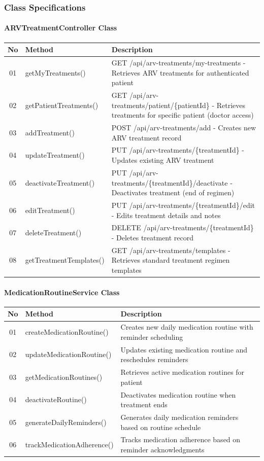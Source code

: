 \documentclass[12pt,a4paper]{article}
\begin{document}
\subsubsection{Class Specifications}

\paragraph{ARVTreatmentController Class}
\begin{longtable}{|c|l|p{8cm}|}
\hline
\textbf{No} & \textbf{Method} & \textbf{Description} \\
\hline
01 & getMyTreatments() & GET /api/arv-treatments/my-treatments - Retrieves ARV treatments for authenticated patient \\
\hline
02 & getPatientTreatments() & GET /api/arv-treatments/patient/\{patientId\} - Retrieves treatments for specific patient (doctor access) \\
\hline
03 & addTreatment() & POST /api/arv-treatments/add - Creates new ARV treatment record \\
\hline
04 & updateTreatment() & PUT /api/arv-treatments/\{treatmentId\} - Updates existing ARV treatment \\
\hline
05 & deactivateTreatment() & PUT /api/arv-treatments/\{treatmentId\}/deactivate - Deactivates treatment (end of regimen) \\
\hline
06 & editTreatment() & PUT /api/arv-treatments/\{treatmentId\}/edit - Edits treatment details and notes \\
\hline
07 & deleteTreatment() & DELETE /api/arv-treatments/\{treatmentId\} - Deletes treatment record \\
\hline
08 & getTreatmentTemplates() & GET /api/arv-treatments/templates - Retrieves standard treatment regimen templates \\
\hline
\end{longtable}

\paragraph{MedicationRoutineService Class}
\begin{longtable}{|c|l|p{8cm}|}
\hline
\textbf{No} & \textbf{Method} & \textbf{Description} \\
\hline
01 & createMedicationRoutine() & Creates new daily medication routine with reminder scheduling \\
\hline
02 & updateMedicationRoutine() & Updates existing medication routine and reschedules reminders \\
\hline
03 & getMedicationRoutines() & Retrieves active medication routines for patient \\
\hline
04 & deactivateRoutine() & Deactivates medication routine when treatment ends \\
\hline
05 & generateDailyReminders() & Generates daily medication reminders based on routine schedule \\
\hline
06 & trackMedicationAdherence() & Tracks medication adherence based on reminder acknowledgments \\
\hline
\end{longtable}
\end{document}
